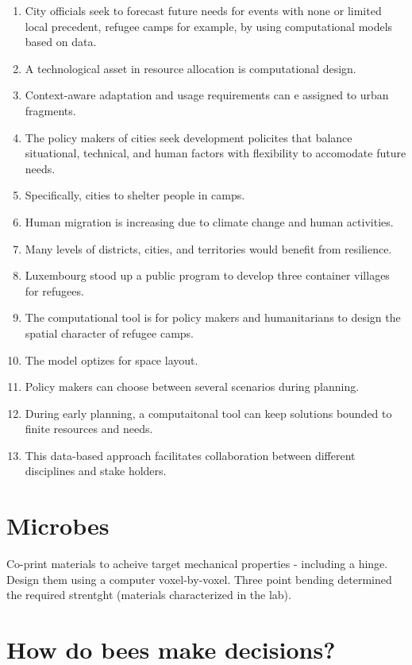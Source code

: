 \documentclass[a4paper,11pt]{article}
\begin{document}
\begin{enumerate}

\item City officials seek to forecast future needs for events with none or limited local precedent, refugee camps for example, by using computational models based on data.

\item A technological asset in resource allocation is computational design.
\item Context-aware adaptation and usage requirements can e assigned to urban fragments.
\item The policy makers of cities seek development policites that balance situational, technical, and human factors with flexibility to accomodate future needs.
\item Specifically, cities to shelter people in camps.
\item Human migration is increasing due to climate change and human activities.
\item Many levels of districts, cities, and territories would benefit from resilience.
\item Luxembourg stood up a public program to develop three container villages for refugees.
\item The computational tool is for policy makers and humanitarians to design the spatial character of refugee camps.
\item The model optizes for space layout.
\item Policy makers can choose between several scenarios during planning.
\item During early planning, a computaitonal tool can keep solutions bounded to finite resources and needs.
\item This data-based approach facilitates collaboration between different disciplines and stake holders.


\end{enumerate}

\section{Microbes}

Co-print materials to acheive target mechanical properties - including a hinge. Design them using a computer voxel-by-voxel.  Three point bending determined the required strentght (materials characterized in the lab). 
\cite{he2021exploiting}


\section{How do bees make decisions?}
\end{document}
